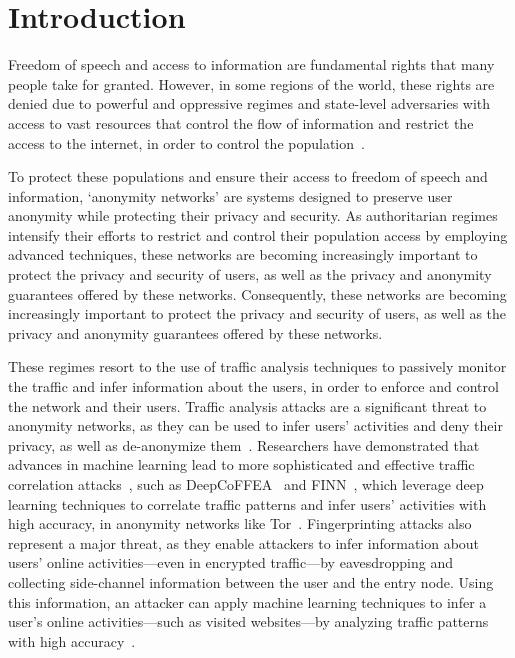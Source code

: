 
%

\chapter{Introduction}\label{cha:introduction}

Freedom of speech and access to information are fundamental rights that many people take for granted. However, in some regions of the world, these rights are denied due to powerful and oppressive regimes and state-level adversaries with access to vast resources that control the flow of information and restrict the access to the internet, in order to control the population~\cite*{aryan2013internet, zittrain2017shifting, alimardani2018internet}. 

To protect these populations and ensure their access to freedom of speech and information, `anonymity networks' are systems designed to preserve user anonymity while protecting their privacy and security. 
As authoritarian regimes intensify their efforts to restrict and control their population access by employing advanced techniques, these networks are becoming increasingly important to protect the privacy and security of users, as well as the privacy and anonymity guarantees offered by these networks.
Consequently, these networks are becoming increasingly important to protect the privacy and security of users, as well as the privacy and anonymity guarantees offered by these networks.

These regimes resort to the use of traffic analysis techniques to passively monitor the traffic and infer information about the users, in order to enforce and control the network and their users. 
Traffic analysis attacks are a significant threat to anonymity networks, as they can be used to infer users' activities and deny their privacy, as well as de-anonymize them~\cite*{chakravarty2014trafficanalysis, winter2012great, robjansen2019dosontor}.
Researchers have demonstrated that advances in machine learning lead to more sophisticated and effective traffic correlation attacks~\cite*{DeepCorr, TorMarker, TirDeanon}, such as DeepCoFFEA~\cite{DeepCoFFEA} and FINN~\cite{FINN}, which leverage deep learning techniques to correlate traffic patterns and infer users' activities with high accuracy, in anonymity networks like Tor~\cite{johnson2013users}.
Fingerprinting attacks also represent a major threat, as they enable attackers to infer information about users' online activities—even in encrypted traffic—by eavesdropping and collecting side-channel information between the user and the entry node.
Using this information, an attacker can apply machine learning techniques to infer a user's online activities—such as visited websites—by analyzing traffic patterns with high accuracy~\cite*{DeepFingerprinting, TikTok, OnlineWebFingerprinting}.

